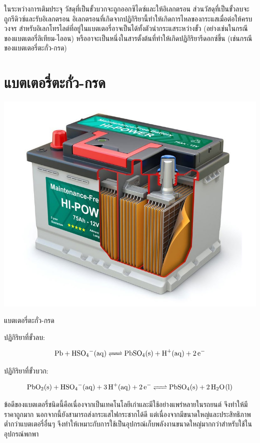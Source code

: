 \documentclass[a4paper,nobib,openany,10pt]{tufte-book}
\begin{document}
ในระหว่างการเติมประจุ วัสดุที่เป็นขั้วบวกจะถูกออกซิไดซ์และให้อิเลกตรอน ส่วนวัสดุที่เป็นขั้วลบจะถูกรีดิวซ์และรับอิเลกตรอน อิเลกตรอนที่เกิดจากปฏิกิริยานี้ทำให้เกิดการไหลของกระแสเมื่อต่อให้ครบวงจร สำหรับอิเลกโทรไลต์ที่อยู่ในแบตเตอรี่อาจเป็นได้ทั้งตัวนำกระแสระหว่างขั้ว (อย่างเช่นในกรณีของแบตเตอรี่ลิเทียม-ไออน) หรืออาจะเป็นหนึ่งในสารตั้งต้นที่ทำให้เกิดปฏิกิริยารีดอกซ์ขึ้น (เช่นกรณีของแบตเตอรี่ตะกั่ว-กรด)

\section{แบตเตอรี่ตะกั่ว-กรด}
\label{sec:orgf717c81}

\begin{marginfigure}
  \centering
  \includegraphics[width=\textwidth]{pictures/lead-acid-battery}
\caption{แบตเตอรี่ตะกั่ว-กรด}
\end{marginfigure}

ปฏิกิริยาที่ขั้วลบ:

$$ \ce{Pb + HSO4^-(aq) <=> PbSO4(s) + H^+(aq) + 2e^-} $$

ปฏิกิริยาที่ขั้วบวก:

$$ \ce{PbO2(s) + HSO4^-(aq) + 3H^+(aq) + 2e^- <=> PbSO4(s) + 2H2O(l)} $$

ข้อดีของแบตเตอรี่ชนิดนี้คือเนื่องจากเป็นเทคโนโลยีเก่าและมีใช้อย่างแพร่หลายในรถยนต์ จึงทำให้มีราคาถูกมาก นอกจากนี้ยังสามารถส่งกระแสไฟกระชากได้ดี แต่เนื่องจากมีขนาดใหญ่และประสิทธิภาพต่ำกว่าแบตเตอรี่อื่นๆ จึงทำให้เหมาะกับการใช้เป็นอุปกรณ์เก็บพลังงานขนาดใหญ่มากกว่าสำหรับใช้ในอุปกรณ์พกพา
\end{document}
